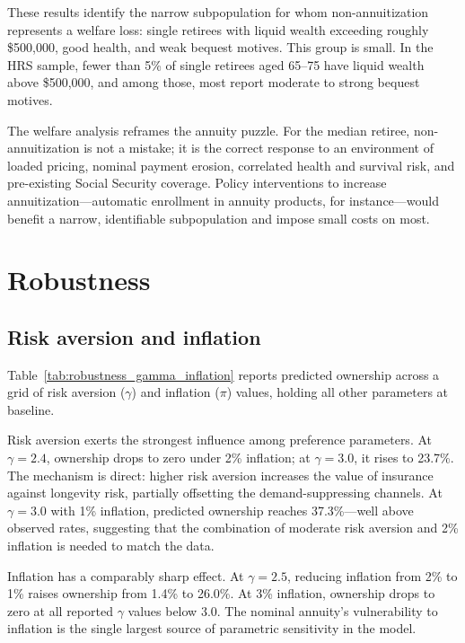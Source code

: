 \documentclass[12pt]{article}
\begin{document}
These results identify the narrow subpopulation for whom non-annuitization represents a welfare loss: single retirees with liquid wealth exceeding roughly \$500,000, good health, and weak bequest motives. This group is small. In the HRS sample, fewer than 5\% of single retirees aged 65--75 have liquid wealth above \$500,000, and among those, most report moderate to strong bequest motives.

The welfare analysis reframes the annuity puzzle. For the median retiree, non-annuitization is not a mistake; it is the correct response to an environment of loaded pricing, nominal payment erosion, correlated health and survival risk, and pre-existing Social Security coverage. Policy interventions to increase annuitization---automatic enrollment in annuity products, for instance---would benefit a narrow, identifiable subpopulation and impose small costs on most.


\section{Robustness}
\label{sec:robustness}

\subsection{Risk aversion and inflation}

Table~\ref{tab:robustness_gamma_inflation} reports predicted ownership across a grid of risk aversion ($\gamma$) and inflation ($\pi$) values, holding all other parameters at baseline.



Risk aversion exerts the strongest influence among preference parameters. At $\gamma = 2.4$, ownership drops to zero under 2\% inflation; at $\gamma = 3.0$, it rises to 23.7\%. The mechanism is direct: higher risk aversion increases the value of insurance against longevity risk, partially offsetting the demand-suppressing channels. At $\gamma = 3.0$ with 1\% inflation, predicted ownership reaches 37.3\%---well above observed rates, suggesting that the combination of moderate risk aversion and 2\% inflation is needed to match the data.

Inflation has a comparably sharp effect. At $\gamma = 2.5$, reducing inflation from 2\% to 1\% raises ownership from 1.4\% to 26.0\%. At 3\% inflation, ownership drops to zero at all reported $\gamma$ values below 3.0. The nominal annuity's vulnerability to inflation is the single largest source of parametric sensitivity in the model.
\end{document}
